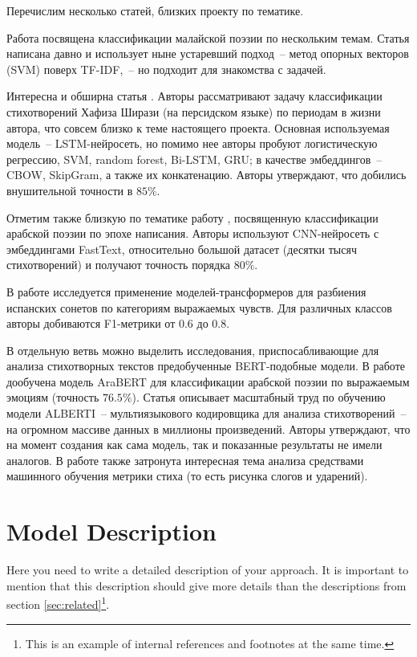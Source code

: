 \documentclass[a4paper,12pt]{article}
\begin{document}
Перечислим несколько статей, близких проекту по тематике.

Работа \cite{noraini2012} посвящена классификации малайской поэзии по нескольким темам. Статья написана давно и использует ныне устаревший подход~-- метод опорных векторов (SVM) поверх TF-IDF,~-- но подходит для знакомства с задачей.

Интересна и обширна статья \cite{ruma2022}. Авторы рассматривают задачу классификации стихотворений Хафиза Ширази (на персидском языке) по периодам в жизни автора, что совсем близко к теме настоящего проекта. Основная используемая модель~-- LSTM-нейросеть, но помимо нее авторы пробуют логистическую регрессию, SVM, random forest, Bi-LSTM, GRU; в качестве эмбеддингов~-- CBOW, SkipGram, а также их конкатенацию. Авторы утверждают, что добились внушительной точности в $85 \%$.

Отметим также близкую по тематике работу \cite{orabi2020}, посвященную классификации арабской поэзии по эпохе написания. Авторы используют CNN-нейросеть с эмбеддингами FastText, относительно большой датасет (десятки тысяч стихотворений) и получают точность порядка $80 \%$.

В работе \cite{barbado2021} исследуется применение моделей-трансформеров для разбиения испанских сонетов по категориям выражаемых чувств. Для различных классов авторы добиваются F1-метрики от $0.6$ до $0.8$.

В отдельную ветвь можно выделить исследования, приспосабливающие для анализа стихотворных текстов предобученные BERT-подобные модели. В работе \cite{shahriar2023} дообучена модель AraBERT для классификации арабской поэзии по выражаемым эмоциям (точность $76.5 \%$). Статья \cite{rosa2023} описывает масштабный труд по обучению модели ALBERTI~-- мультиязыкового кодировщика для анализа стихотворений~-- на огромном массиве данных в миллионы произведений. Авторы утверждают, что на момент создания как сама модель, так и показанные результаты не имели аналогов. В работе также затронута интересная тема анализа средствами машинного обучения метрики стиха (то есть рисунка слогов и ударений).


\section{Model Description}
Here you need to write a detailed description of your approach. It is important to mention that this description should give more details than the descriptions from section \ref{sec:related}\footnote{This is an example of internal references and footnotes at the same time.}. 
\end{document}
